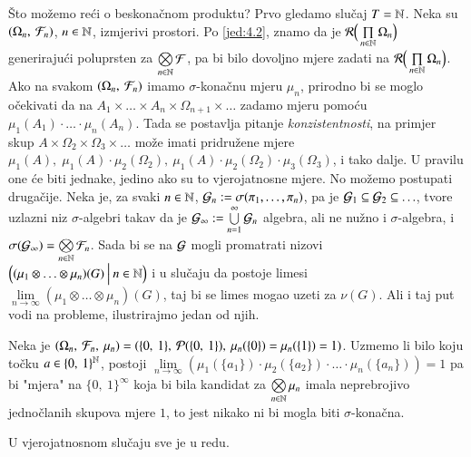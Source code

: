 \v Sto mo\v zemo re\' ci o beskona\v cnom produktu?
Prvo gledamo slu\v caj $T = \mathbb{N}$. Neka su $({\Omega_n}, \: {\mathcal{F}_n})$, $n \in \mathbb{N}$, izmjerivi prostori. Po \eqref{jed:4.2}, znamo da je $\mathcal{R} \Big( \prod\limits_{n \in \mathbb{N}}^{} \Omega_n \Big)$ generiraju\' ci poluprsten za $\bigotimes\limits_{n \in \mathbb{N}}^{} \mathcal{F}$, pa bi bilo dovoljno mjere zadati na $\mathcal{R} \Big( \prod\limits_{n \in \mathbb{N}}^{} \Omega_n \Big)$.
Ako na svakom $({\Omega_n}, \: {\mathcal{F}_n})$ imamo $\sigma$-kona\v cnu mjeru $\mu_n$, prirodno bi se moglo o\v cekivati da na $A_1 \times \ldots \times A_n \times \Omega_{n + 1} \times \ldots$ zadamo mjeru pomo\' cu $\mu_1(A_1) \cdot \ldots \cdot \mu_n(A_n)$.
Tada se postavlja pitanje \emph{konzistentnosti}, na primjer skup $A \times \Omega_2 \times \Omega_3 \times \ldots$ mo\v ze imati pridru\v zene mjere $\mu_1(A), \; \mu_1(A) \cdot \mu_2(\Omega_2), \: \mu_1(A) \cdot \mu_2(\Omega_2) \cdot \mu_3 (\Omega_3)$, i tako dalje.
U pravilu one \' ce biti jednake, jedino ako su to vjerojatnosne mjere.
No mo\v zemo postupati druga\v cije.
Neka je, za svaki $n \in \mathbb{N}$, $\mathcal{G}_n := \sigma({\pi_1, \ldots, \pi_n})$, pa je $\mathcal{G}_1 \subseteq \mathcal{G}_2 \subseteq \ldots$, tvore uzlazni niz $\sigma$-algebri takav da je $\mathcal{G}_{\infty} := \bigcup\limits_{n = 1}^{\infty} \mathcal{G}_n$ algebra, ali ne nu\v zno i $\sigma$-algebra, i $\sigma({\mathcal{G}_{\infty}}) = \bigotimes\limits_{n \in \mathbb{N}}^{} \mathcal{F}_n$.
Sada bi se na $\mathcal{G}$ mogli promatrati nizovi $\Big( {(\mu_1 \otimes \ldots \otimes \mu_n)(G)} \: \Big| \: {n \in \mathbb{N}} \Big)$ i u slu\v caju da postoje limesi $\lim\limits_{n \to \infty} (\mu_1 \otimes \ldots \otimes \mu_n)(G)$, taj bi se limes mogao uzeti za $\nu (G)$.
Ali i taj put vodi na probleme, ilustrirajmo jedan od njih.

\begin{pr}  \label{pr:4.20}
    Neka je $(\Omega_n, \: \mathcal{F}_n, \: \mu_n) = (\{0, \: 1\}, \: \mathcal{P}({\{0, \: 1\}}), \: \mu_n(\{0\}) = \mu_n (\{1\}) = 1)$.
    Uzmemo li bilo koju to\v cku $a \in \{ 0, \: 1 \}^{\mathbb{N}}$, postoji $\lim\limits_{n \to \infty} (\mu_1 (\{ a_1 \}) \cdot \mu_2 (\{ a_2 \}) \cdot \ldots \cdot \mu_n (\{ a_n \}) ) = 1$ pa bi "mjera" na $\{ 0, \: 1 \}^{\infty}$ koja bi bila kandidat za $\bigotimes\limits_{n \in \mathbb{N}}^{} \mu_n$ imala neprebrojivo jedno\v clanih skupova mjere $1$, to jest nikako ni bi mogla biti $\sigma$-kona\v cna. 
\end{pr}

U vjerojatnosnom slu\v caju sve je u redu.

